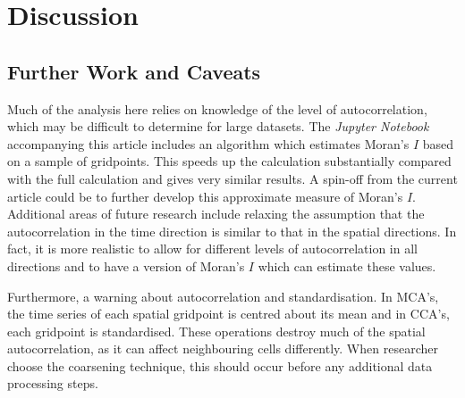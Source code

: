 \documentclass[ijgi,article,submit,moreauthors,pdftex,10pt,a4paper]{Definitions/mdpi}
\begin{document}



\section{Discussion}


\subsection{Further Work and Caveats}
\label{sec:Discussion/Further Work}

Much of the analysis here relies on knowledge of the level of autocorrelation, which may be difficult to determine for large datasets. The \textit{Jupyter Notebook} accompanying this article includes an algorithm which estimates Moran's $I$ based on a sample of gridpoints. This speeds up the calculation substantially compared with the full calculation and gives very similar results. A spin-off from the current article could be to further develop this approximate measure of Moran's $I$. Additional areas of future research include relaxing the assumption that the autocorrelation in the time direction is similar to that in the spatial directions. In fact, it is more realistic to allow for different levels of autocorrelation in all directions and to have a version of Moran's $I$ which can estimate these values.

Furthermore, a warning about autocorrelation and standardisation. In MCA's, the time series of each spatial gridpoint is centred about its mean and in CCA's, each gridpoint is standardised. These operations destroy much of the spatial autocorrelation, as it can affect neighbouring cells differently. When researcher choose the coarsening technique, this should occur before any additional data processing steps.
\end{document}
